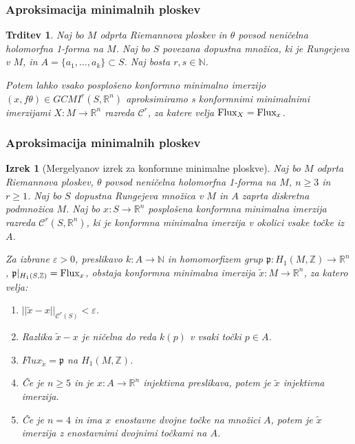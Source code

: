 \documentclass[9pt, table]{beamer}
\newtheorem{izrek}{Izrek}
\newtheorem{trditev}{Trditev}
\newcommand{\R}{\mathbb R}
\newcommand{\N}{\mathbb N}
\newcommand{\Z}{\mathbb Z}
\begin{document}

\begin{frame}
\frametitle{Aproksimacija minimalnih ploskev}

\begin{trditev}
Naj bo $M$ odprta Riemannova ploskev in $\theta$ povsod neničelna holomorfna 1-forma na $M$.
Naj bo $S$ povezana dopustna množica, ki je Rungejeva v $M$, in $A=\{a_{1}, \dots , a_{k} \} \subset S$. Naj bosta $r, s \in \N$. 

Potem lahko vsako posplošeno konformno minimalno imerzijo $(x, f\theta) \in GCMI^{r}(S,\R^{n})$ aproksimiramo s konformnimi minimalnimi imerzijami $X \colon M \to \R^{n}$ razreda $\mathcal{C}^{r}$, za katere velja $\textup{Flux}_{X} = \textup{Flux}_{x}$. 
\end{trditev}

\end{frame}


\begin{frame}
\frametitle{Aproksimacija minimalnih ploskev}

\begin{izrek}[Mergelyanov izrek za konformne minimalne ploskve]
Naj bo $M$ odprta Riemannova ploskev, $\theta$ povsod neničelna holomorfna 1-forma na $M$, $n \geq 3$ in $r \geq 1$.
Naj bo $S$ dopustna Rungejeva množica v $M$ in $A$ zaprta diskretna podmnožica $M$. 
Naj bo $x \colon S \to \R^{n}$ posplošena konformna minimalna imerzija razreda $\mathcal{C}^{r}(S, \R^{n})$, ki je konformna minimalna imerzija v okolici vsake točke iz $A$.

Za izbrane $\varepsilon > 0$, preslikavo $k \colon A \to \N$ in homomorfizem grup $\mathfrak{p} \colon H_{1}(M,\Z) \to \R^{n}$, $\mathfrak{p}|_{H_{1}(S,\Z)} = \textup{Flux}_{x}$, obstaja konformna minimalna imerzija $\tilde{x} \colon M \to \R^{n}$, za katero velja:
\begin{enumerate}
\item $||\tilde{x} - x||_{\mathcal{C}^{r}(S)} < \varepsilon$.
\item Razlika $\tilde{x}-x$ je ničelna do reda $k(p)$ v vsaki točki $p\in A$.
\item $Flux_{\tilde{x}} = \mathfrak{p}$ na $H_{1}(M,\Z)$.
\item Če je $n\geq5$ in je $x \colon A \to \R^{n}$ injektivna preslikava, potem je $\tilde{x}$ injektivna imerzija.
\item Če je $n=4$ in ima $x$ enostavne dvojne točke na množici $A$, potem je $\tilde{x}$ imerzija z enostavnimi dvojnimi točkami na $A$.
\end{enumerate}
\end{izrek}

\end{frame}
\end{document}
